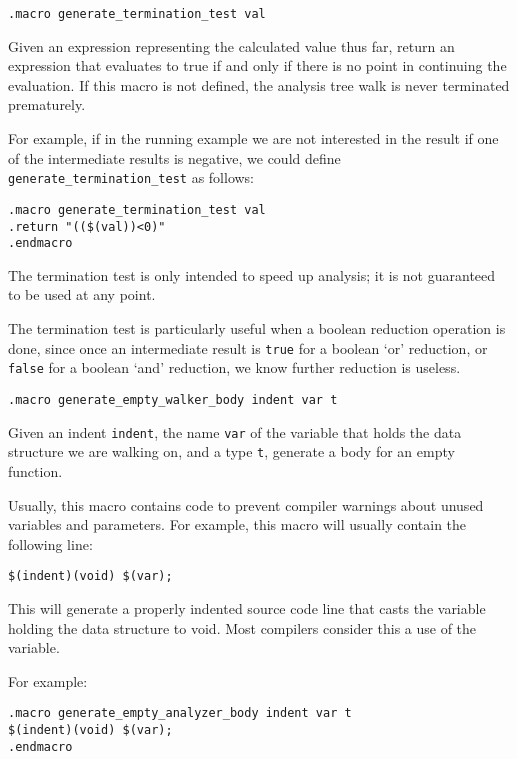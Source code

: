 \begin{verbatim}
.macro generate_termination_test val
\end{verbatim}
\begin{desc}
Given an expression representing the calculated value thus far, return
an expression that evaluates to true if and only if there is no point
in continuing the evaluation. If this macro is not defined, the analysis
tree walk is never terminated prematurely.
\par
For example, if in the running example we are not interested in the
result if one of the intermediate results is negative, we could define
\verb'generate_termination_test' as follows:
\begin{verbatim}
.macro generate_termination_test val
.return "(($(val))<0)"
.endmacro
\end{verbatim}
The termination test is only intended to speed up analysis; it is not
guaranteed to be used at any point.
\par
The termination test is particularly useful when a boolean reduction
operation is done, since once an intermediate result is \texttt{true} for
a boolean `or' reduction, or \texttt{false} for a boolean `and' reduction,
we know further reduction is useless.
\end{desc}
\begin{verbatim}
.macro generate_empty_walker_body indent var t
\end{verbatim}
\begin{desc}
Given an indent \verb'indent', the name \verb'var' of the variable
that holds the data structure we are walking on, and a type \verb't',
generate a body for an empty function.

Usually, this macro contains code to prevent compiler warnings about
unused variables and parameters.  For example, this macro will usually
contain the following line:
\begin{verbatim}
$(indent)(void) $(var);
\end{verbatim}
This will generate a properly indented source code line that casts the
variable holding the data structure to void. Most compilers consider
this a use of the variable.
\par
For example:
\begin{verbatim}
.macro generate_empty_analyzer_body indent var t
$(indent)(void) $(var);
.endmacro
\end{verbatim}
\end{desc}
